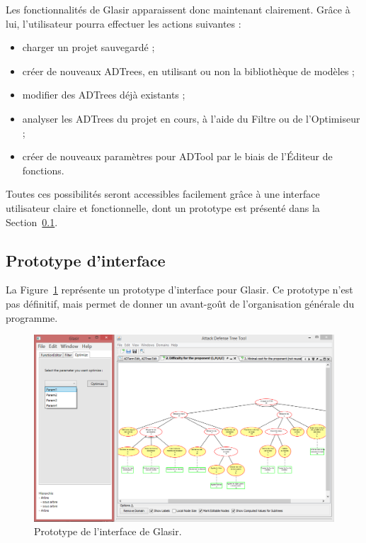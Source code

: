    Les fonctionnalités de Glasir apparaissent donc maintenant clairement. Grâce à lui, l'utilisateur pourra effectuer les actions suivantes : 

    \begin{itemize}
    \item charger un projet sauvegardé ;
    \item créer de nouveaux ADTrees, en utilisant ou non la bibliothèque de modèles ;
    \item modifier des ADTrees déjà existants ;
    \item analyser les ADTrees du projet en cours, à l'aide du Filtre ou de l'Optimiseur ;
    \item créer de nouveaux paramètres pour ADTool par le biais de l'Éditeur de fonctions.
    \end{itemize}  

    Toutes ces possibilités seront accessibles facilement grâce à une interface utilisateur claire et fonctionnelle, dont un prototype est présenté dans la {\sc Section}~\ref{sec:interface}.      
    
    \subsection{Prototype d'interface}
    \label{sec:interface}
    
    La {\sc Figure}~\ref{fig:interface} représente un prototype d'interface pour Glasir. Ce prototype n'est pas définitif, mais permet de donner un avant-goût de l'organisation générale du programme. 

    \begin{figure}[h!]
        \centering
        \includegraphics[height=0.72\textwidth]{figure/interface.png}
        \caption{Prototype de l'interface de Glasir.}
        \label{fig:interface}
    \end{figure}
    
